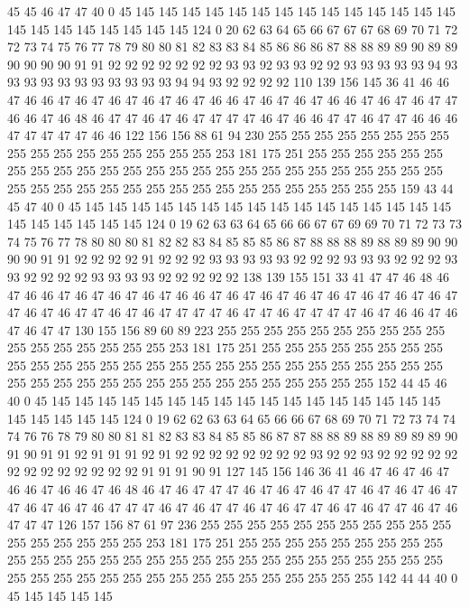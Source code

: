 45 45 46 47 47 40 0 45 145 145 145 145 145 145 145 145 145 145 145 145
145 145 145 145 145 145 145 145 145 145 124 0 20 62 63 64 65 66 67 67
67 68 69 70 71 72 72 73 74 75 76 77 78 79 80 80 81 82 83 83
84 85 86 86 86 87 88 88 89 89 90 89 89 90 90 90 90 91 91 92
92 92 92 92 92 92 93 93 92 93 93 92 92 93 93 93 93 93 94 93
93 93 93 93 93 93 93 93 93 93 94 94 93 92 92 92 92 110 139 156
145 36 41 46 46 47 46 46 47 46 47 46 47 46 47 46 47 46 46 47
46 47 46 47 46 46 47 46 47 46 47 47 46 46 47 46 48 46 47 47
46 47 46 47 47 47 47 46 47 46 46 47 47 46 47 47 46 46 46 47
47 47 47 47 46 46 122 156 156 88 61 94 230 255 255 255 255 255 255 255
255 255 255 255 255 255 255 255 255 255 253 181 175 251 255 255 255 255 255 255
255 255 255 255 255 255 255 255 255 255 255 255 255 255 255 255 255 255 255 255
255 255 255 255 255 255 255 255 255 255 255 255 255 255 255 255 159 43 44 45
47 40 0 45 145 145 145 145 145 145 145 145 145 145 145 145 145 145 145 145
145 145 145 145 145 145 124 0 19 62 63 63 64 65 66 66 67 67 69 69
70 71 72 73 73 74 75 76 77 78 80 80 80 81 82 82 83 84 85 85
85 86 87 88 88 88 89 88 89 89 90 90 90 90 91 91 92 92 92 92
91 92 92 92 93 93 93 93 93 92 92 92 93 93 93 92 92 92 93 93
92 92 92 92 93 93 93 93 92 92 92 92 92 138 139 155 151 33 41 47
47 46 48 46 47 46 46 47 46 47 46 47 46 47 46 46 47 46 47 46
47 46 47 46 47 46 47 46 47 46 47 47 46 47 46 47 47 46 47 46
47 47 47 47 46 47 47 46 47 47 47 47 46 47 46 46 47 46 47 46
47 47 130 155 156 89 60 89 223 255 255 255 255 255 255 255 255 255 255 255
255 255 255 255 255 255 253 181 175 251 255 255 255 255 255 255 255 255 255 255
255 255 255 255 255 255 255 255 255 255 255 255 255 255 255 255 255 255 255 255
255 255 255 255 255 255 255 255 255 255 255 255 255 152 44 45 46 40 0 45
145 145 145 145 145 145 145 145 145 145 145 145 145 145 145 145 145 145 145 145
145 145 124 0 19 62 62 63 63 64 65 66 66 67 68 69 70 71 72 73
74 74 74 76 76 78 79 80 80 81 81 82 83 83 84 85 85 86 87 87
88 88 89 88 89 89 89 89 90 91 90 91 91 92 91 91 91 92 91 92
92 92 92 92 92 92 92 93 92 92 93 92 92 92 92 92 92 92 92 92
92 92 92 92 91 91 91 90 91 127 145 156 146 36 41 46 47 46 47 46
47 46 46 47 46 46 47 46 48 46 47 46 47 47 47 46 47 46 47 46
47 47 46 47 46 47 46 47 47 46 47 46 47 46 47 47 47 46 47 46
47 47 46 47 46 47 47 46 47 46 47 47 46 47 46 47 47 47 126 157
156 87 61 97 236 255 255 255 255 255 255 255 255 255 255 255 255 255 255 255
255 255 253 181 175 251 255 255 255 255 255 255 255 255 255 255 255 255 255 255
255 255 255 255 255 255 255 255 255 255 255 255 255 255 255 255 255 255 255 255
255 255 255 255 255 255 255 255 255 255 142 44 44 40 0 45 145 145 145 145
